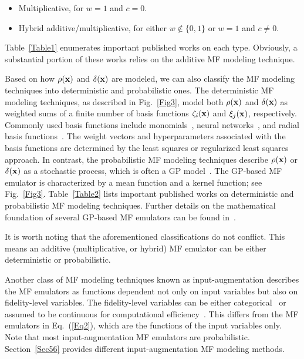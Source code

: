 \documentclass[iicol,sn-basic]{sn-jnl}%
\theoremstyle{thmstyleone}%
\theoremstyle{thmstyletwo}
\theoremstyle{thmstylethree}
\begin{document}
\begin{linenumbers}
\begin{itemize}
    \item Multiplicative, for $w=1$ and $c=0$.

    \item Hybrid additive/multiplicative, for either $w \notin \{0,1\}$ or $w=1$ and $c \neq 0$.
\end{itemize}
Table~\ref{Table1} enumerates important published works on each type.
Obviously, a substantial portion of these works relies on the additive MF modeling technique.

Based on how $\rho({\bf {x}})$ and $\delta({\bf{x}})$ are modeled, we can also classify the MF modeling techniques into deterministic and probabilistic ones.
The deterministic MF modeling techniques, as described in Fig.~\ref{Fig3}, model both $\rho({\bf {x}})$ and $\delta({\bf{x}})$ as weighted sums of a finite number of basis functions $\zeta_i({\bf {x}})$ and $\xi_j({\bf x})$, respectively.
Commonly used basis functions include monomials~\citep{Zhang2018,Godino2019}, neural networks~\citep{Kou2019}, and radial basis functions~\citep{Tyan2015,Durantin2017}. 
The weight vectors and hyperparameters associated with the basis functions are determined by the least squares or regularized least squares approach. 
In contrast, the probabilistic MF modeling techniques describe $\rho({\bf {x}})$ or $\delta({\bf{x}})$ as a stochastic process, which is often a GP model~\citep{Rasmussen2006}.
The GP-based MF emulator is characterized by a mean function and a kernel function; see Fig.~\ref{Fig3}.   
Table~\ref{Table2} lists important published works on deterministic and probabilistic MF modeling techniques.
Further details on the mathematical foundation of several GP-based MF emulators can be found in~\cite{Brevault2020}.

It is worth noting that the aforementioned classifications do not conflict.
This means an additive (multiplicative, or hybrid) MF emulator can be either deterministic or probabilistic.

Another class of MF modeling techniques known as input-augmentation describes the MF emulators as functions dependent not only on input variables but also on fidelity-level variables.
The fidelity-level variables can be either  categorical~\citep{Foumani2023} or assumed to be continuous for computational efficiency~\citep{Kandasamy2017}.
This differs from the MF emulators in Eq.~(\ref{Eq2}), which are the functions of the input variables only.
Note that most input-augmentation MF emulators are probabilistic.
Section~\ref{Sec56} provides different input-augmentation MF modeling methods.


\end{linenumbers}
\end{document}
